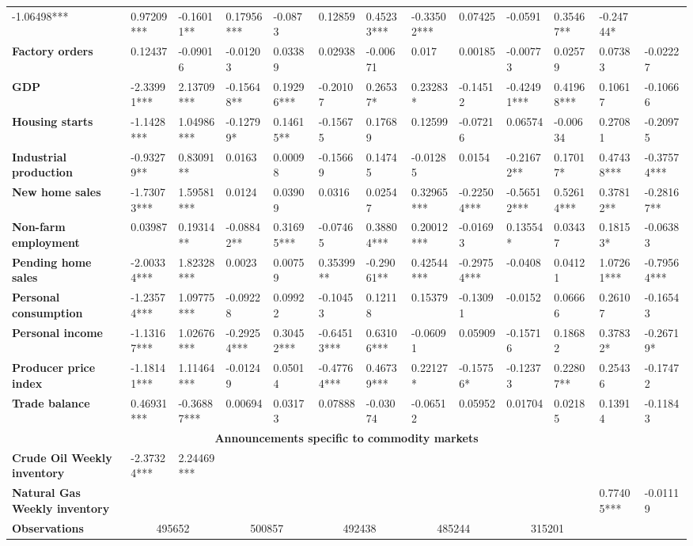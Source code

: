 \begin{sidewaystable}
{\begin{tabular}{@{}lllllllllllll@{}}
-1.06498*** & 0.97209*** & -0.16011** & 0.17956*** & -0.0873 & 0.12859 & 0.45233*** & -0.33502*** & 0.07425 & -0.0591 & 0.35467** & -0.24744* \\ \textbf{Factory orders}& 0.12437 & -0.09016 & -0.01203 & 0.03389 & 0.02938 & -0.00671 & 0.017 & 0.00185 & -0.00773 & 0.02579 & 0.07383 & -0.02227 \\ \textbf{GDP}& -2.33991*** & 2.13709*** & -0.15648** & 0.19296*** & -0.20107 & 0.26537* & 0.23283* & -0.14512 & -0.42491*** & 0.41968*** & 0.10617 & -0.10666 \\ \textbf{Housing starts}& -1.1428*** & 1.04986*** & -0.12799* & 0.14615** & -0.15675 & 0.17689 & 0.12599 & -0.07216 & 0.06574 & -0.00634 & 0.27081 & -0.20975 \\ \textbf{Industrial production}& -0.93279** & 0.83091** & 0.0163 & 0.00098 & -0.15669 & 0.14745 & -0.01285 & 0.0154 & -0.21672** & 0.17017* & 0.47438*** & -0.37574*** \\ \textbf{New home sales}& -1.73073*** & 1.59581*** & 0.0124 & 0.03909 & 0.0316 & 0.02547 & 0.32965*** & -0.22504*** & -0.56512*** & 0.52614*** & 0.37812** & -0.28167** \\ \textbf{Non-farm employment}& 0.03987 & 0.19314** & -0.08842** & 0.31695*** & -0.07465 & 0.38804*** & 0.20012*** & -0.01693 & 0.13554* & 0.03437 & 0.18153* & -0.06383 \\ \textbf{Pending home sales}& -2.00334*** & 1.82328*** & 0.0023 & 0.00759 & 0.35399** & -0.29061** & 0.42544*** & -0.29754*** & -0.0408 & 0.04121 & 1.07261*** & -0.79564*** \\ \textbf{Personal consumption}& -1.23574*** & 1.09775*** & -0.09228 & 0.09922 & -0.10453 & 0.12118 & 0.15379 & -0.13091 & -0.0152 & 0.06666 & 0.26107 & -0.16543 \\ \textbf{Personal income}& -1.13167*** & 1.02676*** & -0.29254*** & 0.30452*** & -0.64513*** & 0.63106*** & -0.06091 & 0.05909 & -0.15716 & 0.18682 & 0.37832* & -0.26719* \\ \textbf{Producer price index}& -1.18141*** & 1.11464*** & -0.01249 & 0.05014 & -0.47764*** & 0.46739*** & 0.22127* & -0.15756* & -0.12373 & 0.22807** & 0.25436 & -0.17472 \\ \textbf{Trade balance}& 0.46931*** & -0.36887*** & 0.00694 & 0.03173 & 0.07888 & -0.03074 & -0.06512 & 0.05952 & 0.01704 & 0.02185 & 0.13914 & -0.11843 \\  \midrule \multicolumn{13}{c}{\textbf{Announcements specific to commodity markets}} \\ \midrule \textbf{Crude Oil Weekly inventory}& -2.37324*** & 2.24469*** &  &  &  &  &  &  &  &  &  &  \\ \textbf{Natural Gas Weekly inventory}&  &  &  &  &  &  &  &  &  &  & 0.77405*** & -0.01119 \\  \midrule \textbf{Observations}             &\multicolumn{2}{c}{ 495652 }                                                 & \multicolumn{2}{c}{ 500857 }                                                 & \multicolumn{2}{c}{ 492438 }                                                 & \multicolumn{2}{c}{ 485244 }                                                 & \multicolumn{2}{c}{ 315201 }               
\end{tabular}}
\end{sidewaystable}
